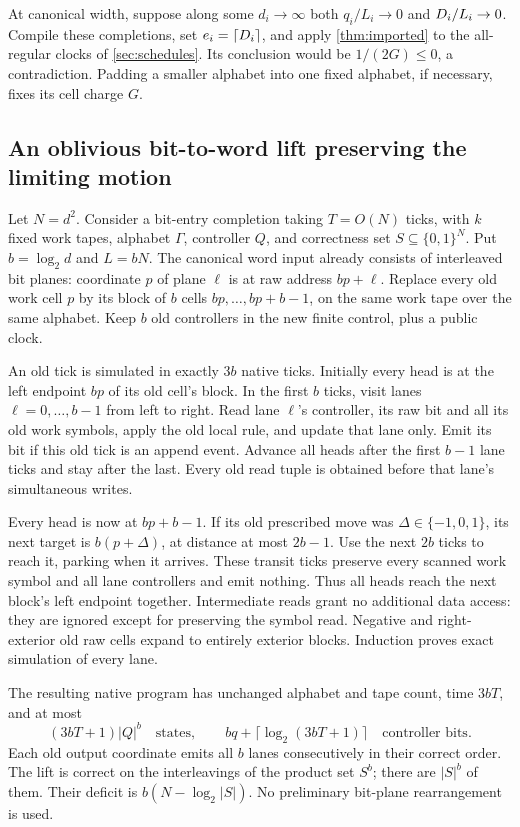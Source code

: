 At canonical width, suppose along some $d_i\to\infty$ both
$q_i/L_i\to0$ and $D_i/L_i\to0$. Compile these completions, set
$e_i=\lceil D_i\rceil$, and apply \cref{thm:imported} to the
all-regular clocks of \cref{sec:schedules}. Its conclusion would be
$1/(2G)\le0$, a contradiction. Padding a smaller alphabet into one
fixed alphabet, if necessary, fixes its cell charge $G$.

\subsection{An oblivious bit-to-word lift preserving the limiting motion}

Let $N=d^2$. Consider a bit-entry completion taking $T=O(N)$ ticks,
with $k$ fixed work tapes, alphabet $\Gamma$, controller $Q$, and
correctness set $S\subseteq\{0,1\}^N$. Put $b=\log_2d$ and $L=bN$.
The canonical word input already consists of interleaved bit planes:
coordinate $p$ of plane $\ell$ is at raw address $bp+\ell$.
Replace every old work cell $p$ by its block of $b$ cells
$bp,\ldots,bp+b-1$, on the same work tape over the same alphabet.
Keep $b$ old controllers in the new finite control, plus a public clock.

An old tick is simulated in exactly $3b$ native ticks. Initially every
head is at the left endpoint $bp$ of its old cell's block. In the first
$b$ ticks, visit lanes $\ell=0,\ldots,b-1$ from left to right. Read lane
$\ell$'s controller, its raw bit and all its old work symbols, apply the
old local rule, and update that lane only. Emit its bit if this old tick
is an append event. Advance all heads after the first $b-1$ lane ticks
and stay after the last. Every old read tuple is obtained before that
lane's simultaneous writes.

Every head is now at $bp+b-1$. If its old prescribed move was
$\Delta\in\{-1,0,1\}$, its next target is $b(p+\Delta)$, at distance
at most $2b-1$. Use the next $2b$ ticks to reach it, parking when it
arrives. These transit ticks preserve every scanned work symbol and
all lane controllers and emit nothing. Thus all heads reach the next
block's left endpoint together. Intermediate reads grant no additional
data access: they are ignored except for preserving the symbol read.
Negative and right-exterior old raw cells expand to entirely exterior
blocks. Induction proves exact simulation of every lane.

The resulting native program has unchanged alphabet and tape count,
time $3bT$, and at most
\[
 (3bT+1)|Q|^b\quad\text{states},\qquad
 bq+\lceil\log_2(3bT+1)\rceil\quad\text{controller bits}.
\]
Each old output coordinate emits all $b$ lanes consecutively in their
correct order. The lift is correct on the interleavings of the product
set $S^b$; there are $|S|^b$ of them.
Their deficit is $b(N-\log_2|S|)$. No preliminary bit-plane rearrangement
is used.

